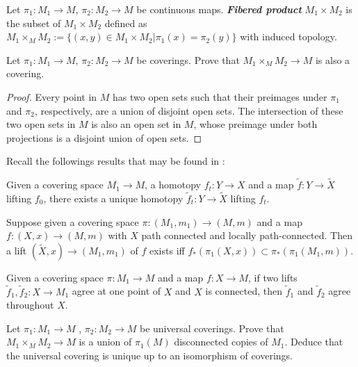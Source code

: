 \documentclass{article}
\begin{document}
\begin{defn}
	Let $\pi_1:M_1\to M$, $\pi_2:M_2\to M$ be continuous maps. \textbf{\textit{Fibered product}} $M_1\times M_2$ is the subset of $M_1\times M_2$ defined as $M_1\times_MM_2:=\{(x,y)\in M_1\times M_2|\pi_1(x)=\pi_2(y)\}$ with induced topology.
\end{defn}
\begin{exercise}
	Let $\pi_1 : M_1 \to M$, $\pi_2 : M_2 \to M$ be coverings. Prove that $M_1\times_M M_2 \to M$ is also a covering.
\end{exercise}
\begin{proof}
	Every point in $M$ has two open sets such that their preimages under $\pi_1$ and $\pi_2$, respectively, are a union of disjoint open sets. The intersection of these two open sets in $M$ is also an open set in $M$, whose preimage under both projections is a disjoint union of open sets.
\end{proof}
Recall the followings results that may be found in \cite{hatcher}:
\begin{prop}
	Given a covering space $M_1\to M$, a homotopy $f_t:Y\to X$ and a map $\tilde f:Y\to\tilde X$ lifting $f_0$, there exists a unique homotopy $\tilde f_t:Y\to\tilde X$ lifting $f_t$.
\end{prop}
\begin{prop}
	Suppose given a covering space $\pi:(M_1,m_1)\to (M,m)$ and a map $f:(X,x)\to (M,m)$ with $X$ path connected and locally path-connected. Then a lift $(\tilde X,x)\to (M_1,m_1)$ of $f$ exists iff $f_*(\pi_1(X,x))\subset\pi_*(\pi_1(M_1,m))$.
\end{prop}
\begin{prop}
	Given a covering space $\pi:M_1\to M$ and a map $f:X\to M$, if two lifts $\tilde f_1,\tilde f_2:X\to M_1$ agree at one point of $X$ and $X$ is connected, then $\tilde f_1$ and $\tilde f_2$ agree throughout $X$.
\end{prop}
\begin{exercise}
	Let $\pi_1 : M_1 \to M$ , $\pi_2 : M_2 \to M$ be universal coverings. Prove that $M_1 \times_M M_2 \to M$ is a union of $\pi_1(M)$ disconnected copies of $M_1$. Deduce that the universal covering is unique up to an isomorphism of coverings.
\end{exercise}
\iffalse
\begin{proof}[Solution]
	Universal covering means that it is a cover of any other connected covering. Since $M_1\times_M M_2$ is also a cover, we have covering maps
	\[\begin{tikzcd}
		M_1\arrow[dr,dashed]\arrow[ddr,bend right,"\pi_1",swap]&&M_2\arrow[dl,dashed]\arrow[ddl,bend left,"\pi_2"]\\
		&M_1\times_M M_2\arrow[d]\\
		&M
	\end{tikzcd}\]
	A class of loops $[\gamma]$ in $\pi_1(M)$ 
\end{proof}\fi
\end{document}
